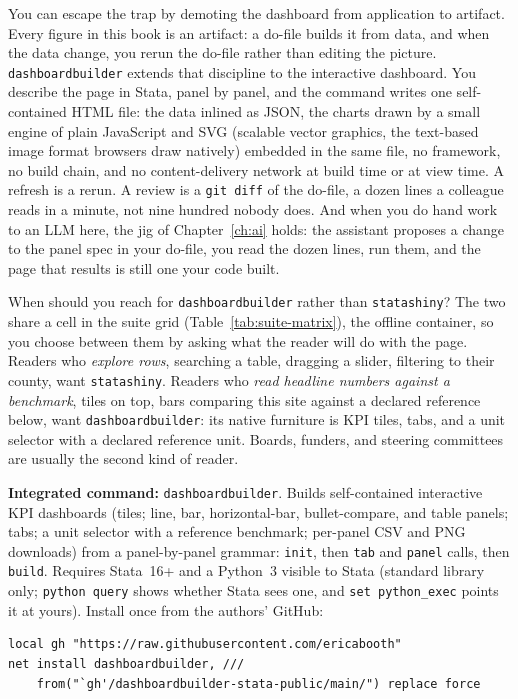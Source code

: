 You can escape the trap by demoting the dashboard from application to artifact. Every figure in this book is an artifact: a do-file builds it from data, and when the data change, you rerun the do-file rather than editing the picture. \texttt{dashboardbuilder} extends that discipline to the interactive dashboard. You describe the page in Stata, panel by panel, and the command writes one self-contained HTML file: the data inlined as JSON, the charts drawn by a small engine of plain JavaScript and SVG (scalable vector graphics, the text-based image format browsers draw natively) embedded in the same file, no framework, no build chain, and no content-delivery network at build time or at view time. A refresh is a rerun. A review is a \texttt{git diff} of the do-file, a dozen lines a colleague reads in a minute, not nine hundred nobody does. And when you do hand work to an LLM here, the jig of Chapter~\ref{ch:ai} holds: the assistant proposes a change to the panel spec in your do-file, you read the dozen lines, run them, and the page that results is still one your code built.

When should you reach for \texttt{dashboardbuilder} rather than \texttt{statashiny}? The two share a cell in the suite grid (Table~\ref{tab:suite-matrix}), the offline container, so you choose between them by asking what the reader will do with the page. Readers who \emph{explore rows}, searching a table, dragging a slider, filtering to their county, want \texttt{statashiny}. Readers who \emph{read headline numbers against a benchmark}, tiles on top, bars comparing this site against a declared reference below, want \texttt{dashboardbuilder}: its native furniture is KPI tiles, tabs, and a unit selector with a declared reference unit. Boards, funders, and steering committees are usually the second kind of reader.

\begin{kaobox}[frametitle=Package Integration: \texttt{dashboardbuilder}]
\textbf{Integrated command:} \texttt{dashboardbuilder}. Builds self-contained interactive KPI dashboards (tiles; line, bar, horizontal-bar, bullet-compare, and table panels; tabs; a unit selector with a reference benchmark; per-panel CSV and PNG downloads) from a panel-by-panel grammar: \texttt{init}, then \texttt{tab} and \texttt{panel} calls, then \texttt{build}. Requires Stata~16+ and a Python~3 visible to Stata (standard library only; \texttt{python query} shows whether Stata sees one, and \texttt{set python\_exec} points it at yours). Install once from the authors' GitHub:
\par
{\footnotesize
\begin{verbatim}
local gh "https://raw.githubusercontent.com/ericabooth"
net install dashboardbuilder, ///
    from("`gh'/dashboardbuilder-stata-public/main/") replace force
\end{verbatim}
}
\end{kaobox}

